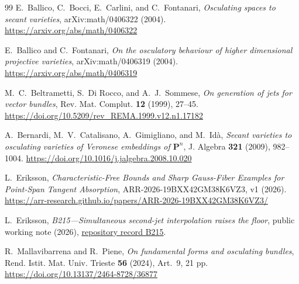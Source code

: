 \documentclass[11pt]{article}
\theoremstyle{definition}
\theoremstyle{remark}
\theoremstyle{plain}
\newcommand{\PP}{\mathbf P}
\begin{document}
{\small
\begin{thebibliography}{99}
E.~Ballico, C.~Bocci, E.~Carlini, and C.~Fontanari,
\emph{Osculating spaces to secant varieties},
arXiv:math/0406322 (2004).
\url{https://arxiv.org/abs/math/0406322}

E.~Ballico and C.~Fontanari,
\emph{On the osculatory behaviour of higher dimensional projective
varieties}, arXiv:math/0406319 (2004).
\url{https://arxiv.org/abs/math/0406319}

M.~C.~Beltrametti, S.~Di Rocco, and A.~J.~Sommese,
\emph{On generation of jets for vector bundles},
Rev. Mat. Complut. \textbf{12} (1999), 27--45.
\url{https://doi.org/10.5209/rev_REMA.1999.v12.n1.17182}

A.~Bernardi, M.~V.~Catalisano, A.~Gimigliano, and M.~Id\`a,
\emph{Secant varieties to osculating varieties of Veronese embeddings of
$\PP^n$}, J. Algebra \textbf{321} (2009), 982--1004.
\url{https://doi.org/10.1016/j.jalgebra.2008.10.020}

L.~Eriksson,
\emph{Characteristic-Free Bounds and Sharp Gauss-Fiber Examples for
Point-Span Tangent Absorption},
ARR-2026-19BXX42GM38K6VZ3, v1 (2026).
\url{https://arr-research.github.io/papers/ARR-2026-19BXX42GM38K6VZ3/}

L.~Eriksson,
\emph{B215---Simultaneous second-jet interpolation raises the floor},
public working note (2026),
\href{https://github.com/lluiseriksson/hodge-conjecture-research-front/blob/main/proofs/B215-simultaneous-second-jet-interpolation-floor.md}{repository record B215}.

R.~Mallavibarrena and R.~Piene,
\emph{On fundamental forms and osculating bundles},
Rend. Istit. Mat. Univ. Trieste \textbf{56} (2024), Art.~9, 21 pp.
\url{https://doi.org/10.13137/2464-8728/36877}
\end{thebibliography}
}
\end{document}
